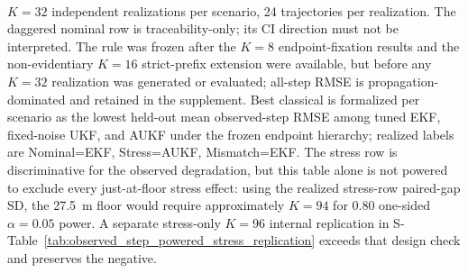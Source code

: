 \begin{table}[t]
  \centering\small
  \caption{Main load-bearing endpoint result: larger seed-disjoint frozen-rule observed-step replication under the $K=8$-established endpoint hierarchy. Positive RGR-GF-minus-best-classical gaps mean the learned estimator is worse than the best tuned classical reference. Nominal is retained for traceability only and is not a discriminative endpoint under the predeclared floor and power audit; its CI direction should not be interpreted.}
  \label{tab:main_k32_replication}
  \\[2pt]{\footnotesize $K=32$ independent realizations per scenario, 24 trajectories per realization. The daggered nominal row is traceability-only; its CI direction must not be interpreted. The rule was frozen after the $K=8$ endpoint-fixation results and the non-evidentiary $K=16$ strict-prefix extension were available, but before any $K=32$ realization was generated or evaluated; all-step RMSE is propagation-dominated and retained in the supplement. Best classical is formalized per scenario as the lowest held-out mean observed-step RMSE among tuned EKF, fixed-noise UKF, and AUKF under the frozen endpoint hierarchy; realized labels are Nominal=EKF, Stress=AUKF, Mismatch=EKF. The stress row is discriminative for the observed degradation, but this table alone is not powered to exclude every just-at-floor stress effect: using the realized stress-row paired-gap SD, the 27.5~m floor would require approximately $K=94$ for 0.80 one-sided $\alpha=0.05$ power. A separate stress-only $K=96$ internal replication in S-Table~\ref{tab:observed_step_powered_stress_replication} exceeds that design check and preserves the negative.}
\end{table}